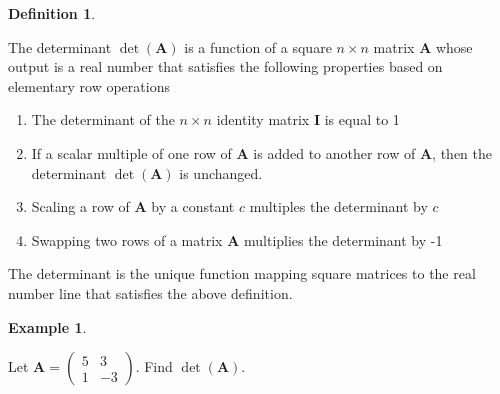 \documentclass[
]{book}
\theoremstyle{definition}
\newtheorem{definition}{Definition}[chapter]
\theoremstyle{definition}
\newtheorem{example}{Example}[chapter]
\theoremstyle{definition}
\theoremstyle{remark}
\begin{document}
\begin{definition}
\protect\hypertarget{def:determinant}{}\label{def:determinant}

The determinant \(\operatorname{det}(\mathbf{A})\) is a function of a square \(n \times n\) matrix \(\mathbf{A}\) whose output is a real number that satisfies the following properties based on elementary row operations

\begin{enumerate}
\def\labelenumi{\arabic{enumi})}
\item
  The determinant of the \(n \times n\) identity matrix \(\mathbf{I}\) is equal to 1
\item
  If a scalar multiple of one row of \(\mathbf{A}\) is added to another row of \(\mathbf{A}\), then the determinant \(\operatorname{det}(\mathbf{A})\) is unchanged.
\item
  Scaling a row of \(\mathbf{A}\) by a constant \(c\) multiples the determinant by \(c\)
\item
  Swapping two rows of a matrix \(\mathbf{A}\) multiplies the determinant by -1
\end{enumerate}

\end{definition}

The determinant is the unique function mapping square matrices to the real number line that satisfies the above definition.

\begin{example}
\protect\hypertarget{exm:unlabeled-div-99}{}\label{exm:unlabeled-div-99}

Let \(\mathbf{A} = \begin{pmatrix} 5 & 3 \\ 1 & -3 \end{pmatrix}\). Find \(\operatorname{det}(\mathbf{A})\).

\end{example}
\end{document}

